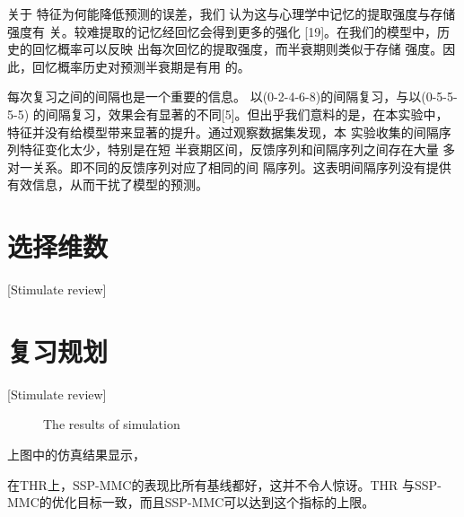 关于 特征为何能降低预测的误差，我们 认为这与心理学中记忆的提取强度与存储强度有 关。较难提取的记忆经回忆会得到更多的强化 [19]。在我们的模型中，历史的回忆概率可以反映 出每次回忆的提取强度，而半衰期则类似于存储 强度。因此，回忆概率历史对预测半衰期是有用 的。

每次复习之间的间隔也是一个重要的信息。 以(0-2-4-6-8)的间隔复习，与以(0-5-5-5-5) 的间隔复习，效果会有显著的不同[5]。但出乎我们意料的是，在本实验中， 特征并没有给模型带来显著的提升。通过观察数据集发现，本 实验收集的间隔序列特征变化太少，特别是在短 半衰期区间，反馈序列和间隔序列之间存在大量 多对一关系。即不同的反馈序列对应了相同的间 隔序列。这表明间隔序列没有提供有效信息，从而干扰了模型的预测。

\section{选择维数}[Stimulate review]

\section{复习规划}[Stimulate review]

\begin{figure}[htbp]
    \begin{minipage}{\textwidth}
    \centering
    \subfigure{\label{fig:thr}}\addtocounter{subfigure}{-2}
    \hspace{2em}
    \subfigure{\label{fig:srp}}\addtocounter{subfigure}{-2}
    \end{minipage}
    \centering
    \begin{minipage}{\textwidth}
    \centering
    \subfigure{\label{fig:wtl}}\addtocounter{subfigure}{-2}
    \hspace{2em}
    \subfigure{\label{fig:new}}\addtocounter{subfigure}{-2}
    \end{minipage}
    \vspace{0.2em}
    \caption{The results of simulation}
    \label{fig:simulation}
  \end{figure}

上图中的仿真结果显示，

在THR上，SSP-MMC的表现比所有基线都好，这并不令人惊讶。THR 与SSP-MMC的优化目标一致，而且SSP-MMC可以达到这个指标的上限。

